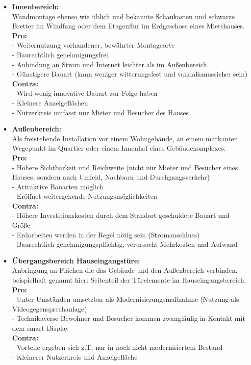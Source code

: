 \documentclass[12pt,oneside,titlepage]{scrartcl}
\begin{document}
 \begin{itemize}
	 \item \textbf{Innenbereich:} 
	 \\ Wandmontage ebenso wie üblich und bekannte Schaukästen und schwarze Bretter im Windfang oder dem Etagenflur im Erdgeschoss eines Mietshauses.\\
	 \textbf{Pro:}\\
	  - Weiternutzung vorhandener, bewährter Montageorte \\
	  - Baurechtlich genehmigungsfrei \\
	  - Anbindung an Strom und Internet leichter als im Außenbereich \\
	  - Günstigere Bauart (kann weniger witterungsfest und vandalismussicher sein)\\
	 \textbf{Contra:}\\
	  - Wird wenig innovative Bauart zur Folge haben\\
	  - Kleinere Anzeigeflächen \\
	  - Nutzerkreis umfasst nur Mieter und Besucher des Hauses
	 \item \textbf{Außenbereich:} 
	 \\ Als freistehende Installation vor einem Wohngebäude, an einem markanten Wegepunkt im Quartier oder einem Innenhof eines Gebäudekomplexes.\\
	 \textbf{Pro:}\\
	  - Höhere Sichtbarkeit und Reichweite (nicht nur Mieter und Besucher eines Hauses, sondern auch Umfeld, Nachbarn und Durchgangsverkehr)  \\
	  - Attraktive Bauarten möglich \\
	  - Eröffnet weitergehende Nutzungsmöglichkeiten \\
	 \textbf{Contra:}\\
	  - Höhere Investitionskosten durch dem Standort geschuldete Bauart und Größe \\
	  - Erdarbeiten werden in der Regel nötig sein (Stromanschluss)  \\
	  - Baurechtlich genehmigungspflichtig, verursacht Mehrkosten und Aufwand
	  \item \textbf{Übergangsbereich Hauseingangstüre:} 
	  \\ Anbringung an Flächen die das Gebäude und den Außenbereich verbinden, beispielhaft genannt hier: Seitenteil der Türelemente im Hauseingangsbereich.\\
	  \textbf{Pro:}\\
	   - Unter Umständen umsetzbar als Modernisierungsmaßnahme (Nutzung als Videogegensprechanlage)  \\
	   - Technikaverse Bewohner und Besucher kommen zwangläufig in Kontakt mit dem smart Display \\
	  \textbf{Contra:}\\
	   -  Vorteile ergeben sich z.T. nur in noch nicht modernisiertem Bestand \\
	   -  Kleinerer Nutzerkreis und Anzeigefläche \\
 \end{itemize}
\end{document}
